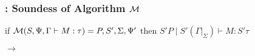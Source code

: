 \begin{frame}
  \frametitle{\qub{}: Soundess of Algorithm $\M$}
  \begin{center}
\begin{theorem}[Soundness of $\M$]
  if $\mathcal{M}(S, \Psi, \Gamma \vdash M : \tau) = P, S', \Sigma, \Psi'$ then $S' P \mid S' (\Gamma |_\Sigma ) \vdash M : S' \tau$
\end{theorem}
   $\rightarrow$ 
  \end{center}
\end{frame}




